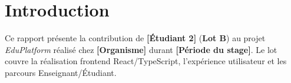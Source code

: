\chapter*{Introduction}

Ce rapport présente la contribution de \textbf{[Étudiant 2]} (\textbf{Lot B}) au projet \textit{EduPlatform} réalisé chez \textbf{[Organisme]} durant \textbf{[Période du stage]}. Le lot couvre la réalisation frontend React/TypeScript, l'expérience utilisateur et les parcours Enseignant/Étudiant.
